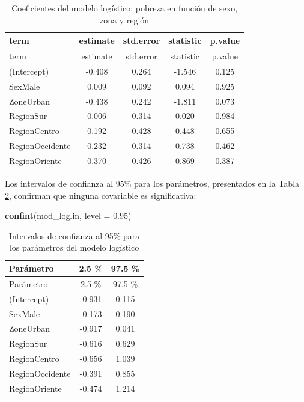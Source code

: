 \documentclass[
  spanish,
  12pt,
]{book}
\newenvironment{Shaded}{\begin{snugshade}}{\end{snugshade}}
\newcommand{\AttributeTok}[1]{\textcolor[rgb]{0.13,0.29,0.53}{#1}}
\newcommand{\FloatTok}[1]{\textcolor[rgb]{0.00,0.00,0.81}{#1}}
\newcommand{\FunctionTok}[1]{\textcolor[rgb]{0.13,0.29,0.53}{\textbf{#1}}}
\newcommand{\NormalTok}[1]{#1}
\begin{document}
\begin{longtable}[]{@{}lcccc@{}}
\caption{\label{tab:tab-logistica-base}Coeficientes del modelo logístico: pobreza en función de sexo, zona y región}\tabularnewline
\toprule\noalign{}
term & estimate & std.error & statistic & p.value \\
\midrule\noalign{}
\endfirsthead
\toprule\noalign{}
term & estimate & std.error & statistic & p.value \\
\midrule\noalign{}
\endhead
\bottomrule\noalign{}
\endlastfoot
(Intercept) & -0.408 & 0.264 & -1.546 & 0.125 \\
SexMale & 0.009 & 0.092 & 0.094 & 0.925 \\
ZoneUrban & -0.438 & 0.242 & -1.811 & 0.073 \\
RegionSur & 0.006 & 0.314 & 0.020 & 0.984 \\
RegionCentro & 0.192 & 0.428 & 0.448 & 0.655 \\
RegionOccidente & 0.232 & 0.314 & 0.738 & 0.462 \\
RegionOriente & 0.370 & 0.426 & 0.869 & 0.387 \\
\end{longtable}

Los intervalos de confianza al 95\% para los parámetros, presentados en la Tabla \ref{tab:tab-ic-logistica}, confirman que ninguna covariable es significativa:

\begin{Shaded}
\begin{Highlighting}[]
\FunctionTok{confint}\NormalTok{(mod\_loglin, }\AttributeTok{level =} \FloatTok{0.95}\NormalTok{)}
\end{Highlighting}
\end{Shaded}

\begin{longtable}[]{@{}lcc@{}}
\caption{\label{tab:tab-ic-logistica}Intervalos de confianza al 95\% para los parámetros del modelo logístico}\tabularnewline
\toprule\noalign{}
Parámetro & 2.5 \% & 97.5 \% \\
\midrule\noalign{}
\endfirsthead
\toprule\noalign{}
Parámetro & 2.5 \% & 97.5 \% \\
\midrule\noalign{}
\endhead
\bottomrule\noalign{}
\endlastfoot
(Intercept) & -0.931 & 0.115 \\
SexMale & -0.173 & 0.190 \\
ZoneUrban & -0.917 & 0.041 \\
RegionSur & -0.616 & 0.629 \\
RegionCentro & -0.656 & 1.039 \\
RegionOccidente & -0.391 & 0.855 \\
RegionOriente & -0.474 & 1.214 \\
\end{longtable}
\end{document}
